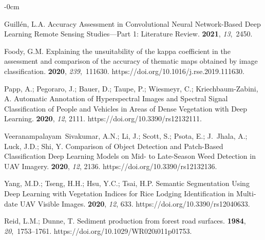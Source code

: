 \documentclass[remotesensing,article,accept,pdftex,moreauthors]{Definitions/mdpi}
\begin{document}
\begin{adjustwidth}{-\extralength}{0cm}
\begin{thebibliography}{999}
Guillén, L.A.
\newblock Accuracy Assessment in Convolutional Neural Network-Based Deep
  Learning Remote Sensing Studies---Part 1: Literature Review.
 {\bf 2021}, {\em 13},~2450.

Foody, G.M.
\newblock Explaining the unsuitability of the kappa coefficient in the
  assessment and comparison of the accuracy of thematic maps obtained by image
  classification.
 {\bf 2020}, {\em 239},~111630.
\newblock https://doi.org/10.1016/j.rse.2019.111630.

Papp, A.; Pegoraro, J.; Bauer, D.; Taupe, P.; Wiesmeyr, C.; Kriechbaum-Zabini,
  A.
\newblock Automatic Annotation of Hyperspectral Images and Spectral Signal
  Classification of People and Vehicles in Areas of Dense Vegetation with Deep
  Learning.
 {\bf 2020}, {\em 12}, {2111}.
\newblock https://doi.org/10.3390/rs12132111.

Veeranampalayam~Sivakumar, A.N.; Li, J.; Scott, S.; Psota, E.; J.~Jhala, A.;
  Luck, J.D.; Shi, Y.
\newblock Comparison of Object Detection and Patch-Based Classification Deep
  Learning Models on Mid- to Late-Season Weed Detection in UAV Imagery.
 {\bf 2020}, {\em 12}, {2136.}
\newblock https://doi.org/10.3390/rs12132136.

Yang, M.D.; Tseng, H.H.; Hsu, Y.C.; Tsai, H.P.
\newblock Semantic Segmentation Using Deep Learning with Vegetation Indices for
  Rice Lodging Identification in Multi-date UAV Visible Images.
 {\bf 2020}, {\em 12}, {633}.
\newblock https://doi.org/10.3390/rs12040633.

Reid, %
 L.M.; Dunne, T.
\newblock Sediment production from forest road surfaces.
 {\bf 1984}, {\em 20},~1753--1761. https://doi.org/10.1029/WR020i011p01753.

\end{thebibliography}



\end{adjustwidth}
\end{document}
